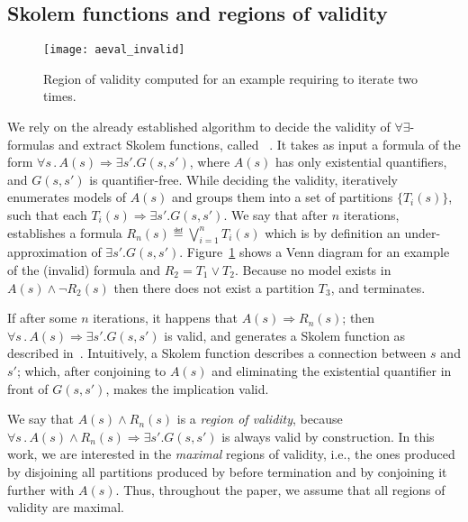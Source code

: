 \subsection{Skolem functions and regions of validity}
\label{sec:aeval}

\begin{figure}[!t]
\centering
\texttt{[image: aeval\_invalid]}
\caption{Region of validity computed for an example requiring \aeval to iterate two times.}
\label{fg:aeval}
\end{figure}


We rely on the already established algorithm to decide the validity of $\forall\exists$-formulas and extract Skolem functions, called \aeval~\cite{fedyukovich2015automated}.
It takes as input a formula of the form $\forall s \,.\,  A(s) \Rightarrow \exists s' . G(s,s')$,
where $A(s)$ has only existential quantifiers, and $G(s,s')$ is quantifier-free.
While deciding the validity, \aeval iteratively enumerates models of $A(s)$ and groups them into a set of partitions $\{T_i(s)\}$, such that each $T_i(s) \Rightarrow \exists s' . G (s, s')$.
We say that after $n$ iterations, \aeval establishes a formula $R_n(s) \eqdef \bigvee_{i=1}^n T_i(s)$ which is by definition an under-approximation of $\exists s' . G (s, s')$.
Figure~\ref{fg:aeval} shows a Venn diagram for an example of the (invalid) formula and $R_2 = T_1 \lor T_2$.
Because no model exists in $A(s) \land \neg{R_2(s)}$ then there does not exist a partition $T_3$, and \aeval terminates.

If after some $n$ iterations, it happens that $A(s) \Rightarrow R_n(s)$; then $\forall s \,.\,  A(s) \Rightarrow \exists s' . G(s,s')$ is valid, and \aeval generates a Skolem function as described in~\cite{katis2016synthesis}.
Intuitively, a Skolem function describes a connection between $s$ and $s'$; which, after conjoining to $A(s)$ and eliminating the existential quantifier in front of $G(s,s')$, makes the implication valid.

We say that $A(s) \land R_n(s)$ is a \emph{region of validity}, because $\forall s \,.\,  A(s) \land R_n(s) \Rightarrow \exists s' . G(s,s')$ is always valid by construction.
In this work, we are interested in the \emph{maximal} regions of validity, i.e., the ones produced by disjoining all partitions produced by \aeval before termination and by conjoining it further with $A(s)$.
Thus, throughout the paper, we assume that all regions of validity are maximal.

